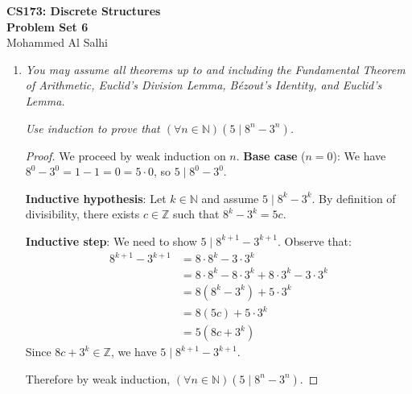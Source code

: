 \documentclass[12pt]{article}
\newcommand{\N}{\mathbb{N}}
\theoremstyle{proofstyle}
\renewcommand{\maketitle}{%
  \begin{flushleft}
    {\Large\bfseries CS173: Discrete Structures}\\[0.3em]
    {\Large\bfseries Problem Set 6}\\[0.5em]
    {\normalsize Mohammed Al Salhi}
  \end{flushleft}
  \vspace{1em}
}
\begin{document}
\maketitle

\begin{enumerate}[left=0pt, itemsep=2em, parsep=1em]

\item \textit{You may assume all theorems up to and including the Fundamental Theorem of
Arithmetic, Euclid's Division Lemma, B\'{e}zout's Identity, and Euclid's Lemma.}

\textit{Use induction to prove that $(\forall n \in \N)(5 \mid 8^n - 3^n)$.}
\begin{proof}
We proceed by weak induction on $n$.
\textbf{Base case} ($n = 0$): We have $8^0 - 3^0 = 1 - 1 = 0 = 5 \cdot 0$,
so $5 \mid 8^0 - 3^0$. \checkmark

\textbf{Inductive hypothesis}: Let $k \in \mathbb{N}$ and assume $5 \mid 8^k - 3^k$.
By definition of divisibility, there exists $c \in \mathbb{Z}$ such that $8^k - 3^k = 5c$.

\textbf{Inductive step}: We need to show $5 \mid 8^{k+1} - 3^{k+1}$. Observe that:
\begin{align*}
8^{k+1} - 3^{k+1} &= 8 \cdot 8^k - 3 \cdot 3^k \\
                   &= 8 \cdot 8^k - 8 \cdot 3^k + 8 \cdot 3^k - 3 \cdot 3^k \\
                   &= 8(8^k - 3^k) + 5 \cdot 3^k \\
                   &= 8(5c) + 5 \cdot 3^k \\
                   &= 5(8c + 3^k)
\end{align*}
Since $8c + 3^k \in \mathbb{Z}$, we have $5 \mid 8^{k+1} - 3^{k+1}$. \checkmark

Therefore by weak induction, $(\forall n \in \mathbb{N})(5 \mid 8^n - 3^n)$.
\end{proof}

\end{enumerate}
\end{document}
